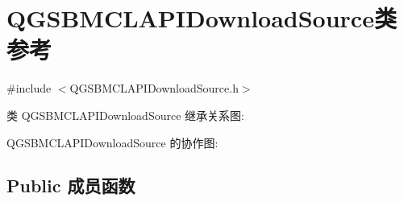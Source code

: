 \hypertarget{class_q_g_s_b_m_c_l_a_p_i_download_source}{}\section{Q\+G\+S\+B\+M\+C\+L\+A\+P\+I\+Download\+Source类 参考}
\label{class_q_g_s_b_m_c_l_a_p_i_download_source}


{\ttfamily \#include $<$Q\+G\+S\+B\+M\+C\+L\+A\+P\+I\+Download\+Source.\+h$>$}



类 Q\+G\+S\+B\+M\+C\+L\+A\+P\+I\+Download\+Source 继承关系图\+:


Q\+G\+S\+B\+M\+C\+L\+A\+P\+I\+Download\+Source 的协作图\+:
\subsection*{Public 成员函数}
